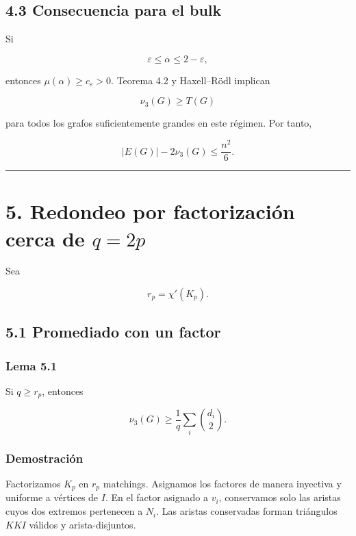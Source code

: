 \documentclass[
  11pt,
]{article}
\begin{document}
\subsection{4.3 Consecuencia para el bulk}\label{consecuencia-para-el-bulk}

Si

\[
\varepsilon\le\alpha\le2-\varepsilon,
\]

entonces \(\mu(\alpha)\ge c_\varepsilon>0\). Teorema 4.2 y Haxell--Rödl implican

\[
\nu_3(G)\ge T(G)
\]

para todos los grafos suficientemente grandes en este régimen. Por tanto,

\[
|E(G)|-2\nu_3(G)
\le
\frac{n^2}{6}.
\tag{4.6}
\]

\begin{center}\rule{0.5\linewidth}{0.5pt}\end{center}

\section{\texorpdfstring{5. Redondeo por factorización cerca de \(q=2p\)}{5. Redondeo por factorización cerca de q=2p}}\label{redondeo-por-factorizaciuxf3n-cerca-de-q2p}

Sea

\[
r_p=\chi'(K_p).
\]

\subsection{5.1 Promediado con un factor}\label{promediado-con-un-factor}

\subsubsection{Lema 5.1}\label{lema-5.1}

Si \(q\ge r_p\), entonces

\[
\boxed{
\nu_3(G)
\ge
\frac1q\sum_i\binom{d_i}{2}.
}
\tag{5.1}
\]

\subsubsection{Demostración}\label{demostraciuxf3n-3}

Factorizamos \(K_p\) en \(r_p\) matchings. Asignamos los factores de manera inyectiva y uniforme a vértices de \(I\). En el factor asignado a \(v_i\), conservamos solo las aristas cuyos dos extremos pertenecen a \(N_i\). Las aristas conservadas forman triángulos \(KKI\) válidos y arista-disjuntos.
\end{document}
